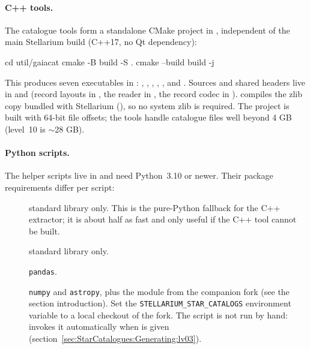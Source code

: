 \paragraph{C++ tools.} The catalogue tools form a standalone CMake project
in , independent of the main Stellarium build (C++17,
no Qt dependency):

\begin{commands}
cd util/gaiacat
cmake -B build -S .
cmake --build build -j
\end{commands}

This produces seven executables in :
, , ,
, ,  and
. Sources and shared headers live in
 and  (record layouts
in , the  reader in , the
record codec in ).
 compiles the zlib copy bundled with Stellarium
(), so no system zlib
is required. The project is built with 64-bit file offsets; the tools
handle catalogue files well beyond 4 GB (level~10 is $\sim$28 GB).

\paragraph{Python scripts.} The helper scripts live in
 and need Python~3.10 or newer. Their package
requirements differ per script:

\begin{description}
  \item[] standard library only. This is the
        pure-Python fallback for the C++ extractor; it is about half as
        fast and only useful if the C++ tool cannot be built.
  \item[] standard library only.
  \item[] \texttt{pandas}.
  \item[] \texttt{numpy} and \texttt{astropy}, plus
        the  module from the companion fork (see the
        section introduction). Set the
        \texttt{STELLARIUM\_\allowbreak STAR\_\allowbreak CATALOGS}
        environment variable to a local checkout of the fork. The script is not run by hand: 
        invokes it automatically when  is given
        (section~\ref{sec:StarCatalogues:Generating:lv03}).
\end{description}

